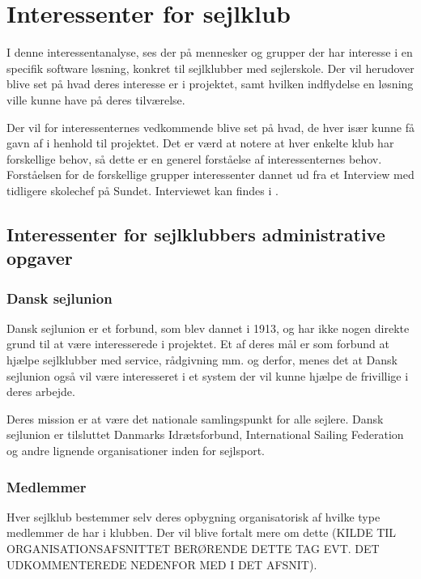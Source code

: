 \chapter{Interessenter for sejlklub}\label{chap:interessent-analyse-ved-sejlklubber}

I denne interessentanalyse, ses der på mennesker og grupper der har interesse i en specifik software løsning, konkret
til sejlklubber med sejlerskole. Der vil herudover blive set på hvad deres interesse er i projektet, samt hvilken
indflydelse en løsning ville kunne have på deres tilværelse.


Der vil for interessenternes vedkommende blive set på hvad, de hver især kunne få gavn af i henhold til projektet. 
Det er værd at notere at hver enkelte klub har forskellige behov, så dette er en generel forståelse af interessenternes
behov. Forståelsen for de forskellige grupper interessenter dannet ud fra et Interview med tidligere skolechef på
Sundet. Interviewet kan findes i .

\section{Interessenter for sejlklubbers administrative opgaver}

\subsection{Dansk sejlunion}

Dansk sejlunion er et forbund, som blev dannet i 1913, og har ikke nogen direkte grund til at være interesserede i
projektet.
Et af deres mål er som forbund at hjælpe sejlklubber med service, rådgivning mm. og derfor, menes det at Dansk sejlunion
også vil være interesseret i et system der vil kunne hjælpe de frivillige i deres arbejde.

Deres mission er at være det nationale samlingspunkt for alle sejlere. Dansk sejlunion er tilsluttet Danmarks
Idrætsforbund, International Sailing Federation og andre lignende organisationer inden for sejlsport.
\citep{Sejlsportdk}


\subsection{Medlemmer}

Hver sejlklub bestemmer selv deres opbygning organisatorisk af hvilke type medlemmer de har i klubben. Der vil blive
fortalt mere om dette (KILDE TIL ORGANISATIONSAFSNITTET BERØRENDE DETTE TAG EVT. DET UDKOMMENTEREDE NEDENFOR MED I DET
AFSNIT). 

